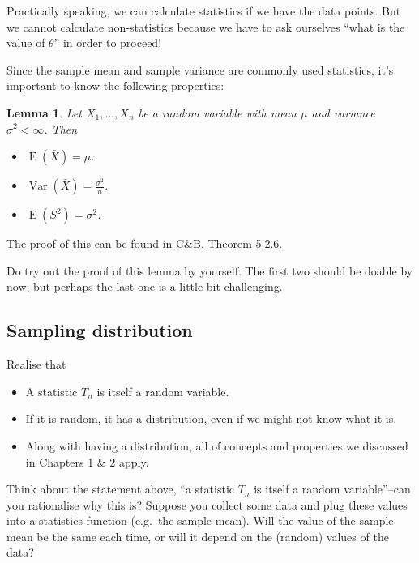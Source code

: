 \documentclass[
]{book}
\providecommand{\tightlist}{%
  \setlength{\itemsep}{0pt}\setlength{\parskip}{0pt}}
\DeclareMathOperator{\E}{E}
\DeclareMathOperator{\Var}{Var}
\newtheorem{lemma}{Lemma}[chapter]
\theoremstyle{definition}
\theoremstyle{definition}
\theoremstyle{definition}
\theoremstyle{definition}
\theoremstyle{remark}
\begin{document}
Practically speaking, we can calculate statistics if we have the data points.
But we cannot calculate non-statistics because we have to ask ourselves ``what is the value of \(\theta\)'' in order to proceed!

Since the sample mean and sample variance are commonly used statistics, it's important to know the following properties:

\begin{lemma}

Let \(X_1,\dots,X_n\) be a random variable with mean \(\mu\) and variance \(\sigma^2<\infty\). Then

\begin{itemize}
\tightlist
\item
  \(\E(\bar X) = \mu\).
\item
  \(\Var(\bar X) = \frac{\sigma^2}{n}\).
\item
  \(\E(S^2)=\sigma^2\).
\end{itemize}

\end{lemma}

The proof of this can be found in C\&B, Theorem 5.2.6.

Do try out the proof of this lemma by yourself.
The first two should be doable by now, but perhaps the last one is a little bit challenging.

\hypertarget{sampling-distribution}{%
\subsection{Sampling distribution}\label{sampling-distribution}}

Realise that

\begin{itemize}
\tightlist
\item
  A statistic \(T_n\) is itself a random variable.
\item
  If it is random, it has a distribution, even if we might not know what it is.
\item
  Along with having a distribution, all of concepts and properties we discussed in Chapters 1 \& 2 apply.
\end{itemize}

Think about the statement above, ``a statistic \(T_n\) is itself a random variable''--can you rationalise why this is? Suppose you collect some data and plug these values into a statistics function (e.g.~the sample mean). Will the value of the sample mean be the same each time, or will it depend on the (random) values of the data?
\end{document}
